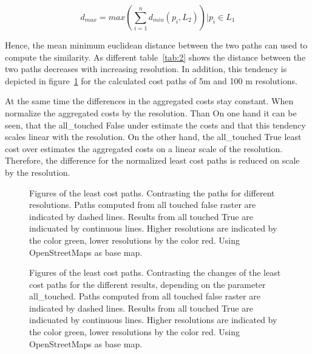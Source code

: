 \begin{equation}
\label{eq:2}
d_{max} = max(\sum_{i=1}^{n} d_{min}(p_i, L_2)) \bigg\vert p_i \in L_1
\end{equation}

Hence, the mean minimum euclidean distance between the two paths can used to compute
the similarity.
As different table~\ref{tab:2} shows the distance between the two paths decreases
with increasing resolution.
In addition, this tendency is depicted in figure~\ref{fig:paths_resolution} for the calculated cost paths of 5m and 100 m resolutions.

At the same time the differences in the aggregated costs stay constant.
 When normalize the aggregated costs by the resolution.
Than On one hand it can be seen, that the all\_touched False under estimate the costs and that this tendency scales
linear with the resolution.
On the other hand, the all\_touched True least cost over estimates the aggregated costs on a linear scale of
the resolution.
Therefore, the difference for the normalized least cost paths is reduced on scale by the resolution.

\begin{figure}
	\centering

	\qquad
	\caption{Figures of the least cost paths. Contrasting the paths for different resolutions. Paths computed from all touched false raster are indicated by dashed lines. Results from all touched True are indicuated by continuous lines. Higher resolutions are indicated by the color green, lower resolutions by the color red. Using OpenStreetMaps as base map.}
	\label{fig:paths_resolution}
\end{figure}

\begin{figure}
	\centering

	\qquad

	\caption{Figures of the least cost paths. Contrasting the changes of the least cost paths for the different results, depending on the parameter all\_touched. Paths computed from all touched false raster are indicated by dashed lines. Results from all touched True are indicuated by continuous lines. Higher resolutions are indicated by the color green, lower resolutions by the color red. Using OpenStreetMaps as base map.}
	\label{fig:paths_alltouched}
\end{figure}

